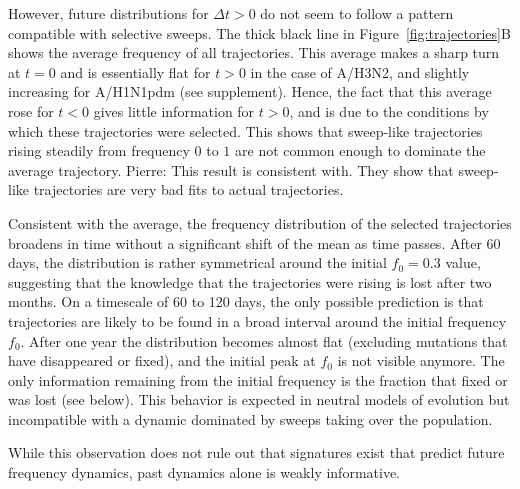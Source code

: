 \documentclass[reprint,amsmath,amssymb,superscriptaddress,showpacs,rmp]{revtex4-1}
\newcommand{\pierre}[1]{{\color{red}Pierre: #1}}
\providecommand{\DIFaddbegin}{} %
\providecommand{\DIFaddend}{} %
\newcommand{\DIFaddincludegraphics}[2][]{{\color{blue}\fbox{\DIFOincludegraphics[#1]{#2}}}} %
\DeclareRobustCommand{\DIFaddbegin}{\DIFOaddbegin \let\includegraphics\DIFaddincludegraphics} %
\DeclareRobustCommand{\DIFaddend}{\DIFOaddend \let\includegraphics\DIFOincludegraphics} %
\begin{document}
However, future distributions for $\Delta t >0$ do not seem to follow a pattern compatible with selective sweeps. 
The thick black line in Figure~\ref{fig:trajectories}B shows the average frequency of all trajectories. 
This average makes a sharp turn at $t=0$ and is essentially flat for $t>0$ in the case of A/H3N2, and slightly increasing for A/H1N1pdm (see supplement).
Hence, the fact that this average rose for $t<0$ gives little information for $t>0$, and is due to the conditions by which these trajectories were selected.
	This shows that sweep-like trajectories rising steadily from frequency $0$ to $1$ are not common enough to dominate the average trajectory.  \DIFaddbegin \pierre{This result is consistent with\citep{illingworth_components_2012}. They show that sweep-like trajectories are very bad fits to actual trajectories.}
\DIFaddend 

Consistent with the average, the frequency distribution of the selected trajectories broadens in time without a significant shift of the mean as time passes. 
After 60 days, the distribution is rather symmetrical around the initial $f_0=0.3$ value, suggesting that the knowledge that the trajectories were rising is lost after two months. 
On a timescale of 60 to 120 days, the only possible prediction is that trajectories are likely to be found in a broad interval around the initial frequency $f_0$. 
After one year the distribution becomes almost flat (excluding mutations that have disappeared or fixed), and the initial peak at $f_0$ is not visible anymore. 
The only information remaining from the initial frequency is the fraction that fixed or was lost (see below). 
This behavior is expected in neutral models of evolution \citep{kimura_diffusion_1964} but incompatible with a dynamic dominated by sweeps taking over the population. 

While this observation does not rule out that signatures exist that predict future frequency dynamics, past dynamics alone is weakly informative.
\end{document}
